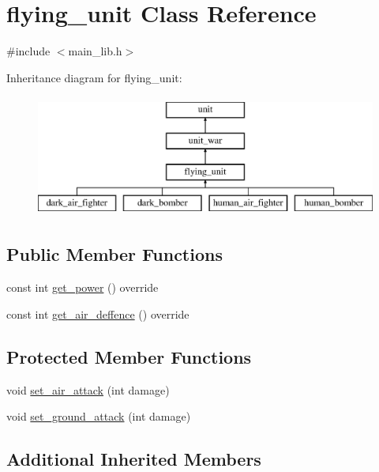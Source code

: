 \hypertarget{classflying__unit}{}\section{flying\+\_\+unit Class Reference}
\label{classflying__unit}


{\ttfamily \#include $<$main\+\_\+lib.\+h$>$}

Inheritance diagram for flying\+\_\+unit\+:\begin{figure}[H]
\begin{center}
\leavevmode
\includegraphics[height=4.000000cm]{classflying__unit}
\end{center}
\end{figure}
\subsection*{Public Member Functions}
\begin{DoxyCompactItemize}
\item 
const int \mbox{\hyperlink{classflying__unit_a95333465a28d47bc5d50427fd3e2cef4}{get\+\_\+power}} () override
\item 
const int \mbox{\hyperlink{classflying__unit_a47dbbf3832a5b5e8f5365d87cdbfddab}{get\+\_\+air\+\_\+deffence}} () override
\end{DoxyCompactItemize}
\subsection*{Protected Member Functions}
\begin{DoxyCompactItemize}
\item 
void \mbox{\hyperlink{classflying__unit_a2b220aabd9faa894c96bb13e03b5a9f5}{set\+\_\+air\+\_\+attack}} (int damage)
\item 
void \mbox{\hyperlink{classflying__unit_a751bb2f477f2904a7de06218159c1dff}{set\+\_\+ground\+\_\+attack}} (int damage)
\end{DoxyCompactItemize}
\subsection*{Additional Inherited Members}


